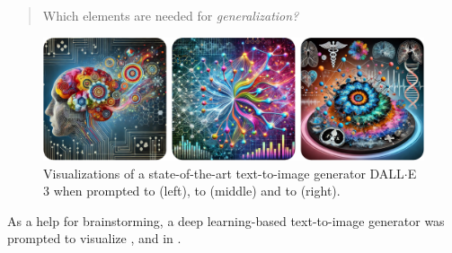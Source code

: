     \begin{quote}
        \centering \Large
        Which elements are needed for \emph{generalization?}
    \end{quote}

    \begin{figure}
        \includegraphics[width=\textwidth]{sections/01_introduction/figures/synthesized_generalization.pdf}
        \caption{Visualizations of a state-of-the-art text-to-image generator DALL$\cdot$E 3 \citep{xx} when prompted to  (left), to  (middle) and to  (right).}
        \label{fig:synthesized_generalization}
    \end{figure}

    As a help for brainstorming, a deep learning-based text-to-image generator \citep{xx} was prompted to visualize ,  and  in .

